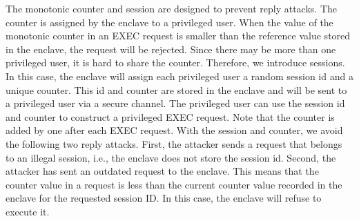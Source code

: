 The monotonic counter and session are designed to prevent reply attacks. The counter is assigned by the enclave to a privileged user. When the value of the monotonic counter in an EXEC request is smaller than the reference value stored in the enclave, the request will be rejected. Since there may be 
more than one privileged user, it is hard to share the counter. Therefore, we introduce sessions. In this case, the enclave will assign each privileged user a random session id and a unique counter. This id and counter are stored in the enclave and will be sent to a privileged user via a secure channel. 
The privileged user can use the session id and counter to construct a privileged EXEC request. Note that the counter is added by one after each EXEC request. With the session and counter, we avoid the following two reply attacks. First, the attacker sends a request that belongs to an illegal session, 
i.e., the enclave does not store the session id. Second, the attacker has sent an outdated request to the enclave. This means that the counter value in a request is less than the current counter value recorded in the enclave for the requested session ID. In this case, the enclave will refuse to 
execute it.

